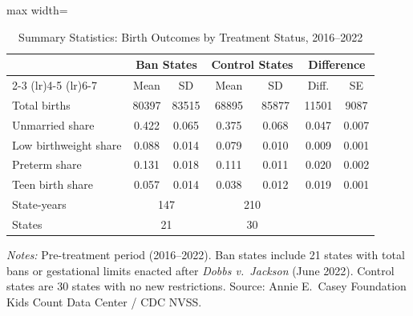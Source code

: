 \begin{table}[H]
\centering
\caption{Summary Statistics: Birth Outcomes by Treatment Status, 2016--2022}
\begin{threeparttable}
\begin{adjustbox}{max width=\textwidth}
\begin{tabular}{lcccccc}
\toprule
 & \multicolumn{2}{c}{Ban States} & \multicolumn{2}{c}{Control States} & \multicolumn{2}{c}{Difference} \\
\cmidrule(lr){2-3} \cmidrule(lr){4-5} \cmidrule(lr){6-7}
 & Mean & SD & Mean & SD & Diff. & SE \\
Total births & 80397 & 83515 & 68895 & 85877 & 11501 & 9087 \\
Unmarried share & 0.422 & 0.065 & 0.375 & 0.068 & 0.047 & 0.007 \\
Low birthweight share & 0.088 & 0.014 & 0.079 & 0.010 & 0.009 & 0.001 \\
Preterm share & 0.131 & 0.018 & 0.111 & 0.011 & 0.020 & 0.002 \\
Teen birth share & 0.057 & 0.014 & 0.038 & 0.012 & 0.019 & 0.001 \\
\midrule
State-years & \multicolumn{2}{c}{147} & \multicolumn{2}{c}{210} & & \\
States & \multicolumn{2}{c}{21} & \multicolumn{2}{c}{30} & & \\
\bottomrule
\end{tabular}
\end{adjustbox}
\begin{tablenotes}[flushleft]
\small
\item \textit{Notes:} Pre-treatment period (2016--2022). Ban states include 21 states with total bans or gestational limits enacted after \textit{Dobbs v.\ Jackson} (June 2022). Control states are 30 states with no new restrictions. Source: Annie E.\ Casey Foundation Kids Count Data Center / CDC NVSS.
\end{tablenotes}
\end{threeparttable}
\label{tab:summary}
\end{table}
